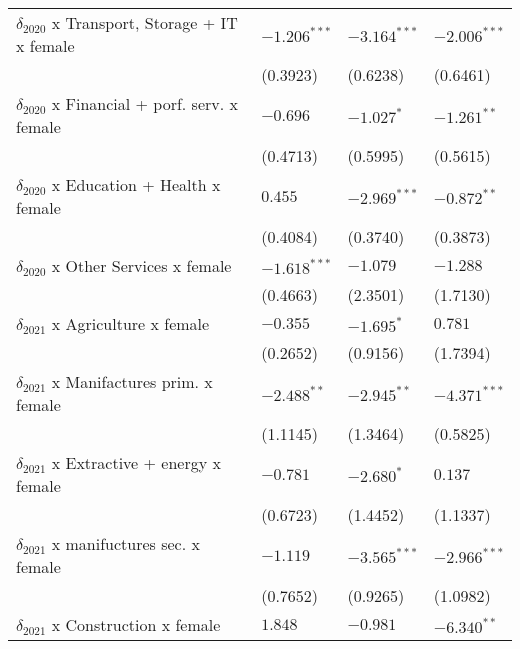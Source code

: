 \begin{tabular}{llll}
$\delta_{2020}$ x Transport, Storage + IT x female &     $-1.206^{***}$ &     $-3.164^{***}$ &     $-2.006^{***}$ \\
                                                   &           (0.3923) &           (0.6238) &           (0.6461) \\
$\delta_{2020}$ x Financial + porf. serv. x female &           $-0.696$ &         $-1.027^*$ &      $-1.261^{**}$ \\
                                                   &           (0.4713) &           (0.5995) &           (0.5615) \\
$\delta_{2020}$ x Education + Health x female      &            $0.455$ &     $-2.969^{***}$ &      $-0.872^{**}$ \\
                                                   &           (0.4084) &           (0.3740) &           (0.3873) \\
$\delta_{2020}$ x Other Services x female          &     $-1.618^{***}$ &           $-1.079$ &           $-1.288$ \\
                                                   &           (0.4663) &           (2.3501) &           (1.7130) \\
$\delta_{2021}$ x Agriculture x female             &           $-0.355$ &         $-1.695^*$ &            $0.781$ \\
                                                   &           (0.2652) &           (0.9156) &           (1.7394) \\
$\delta_{2021}$ x Manifactures prim. x female      &      $-2.488^{**}$ &      $-2.945^{**}$ &     $-4.371^{***}$ \\
                                                   &           (1.1145) &           (1.3464) &           (0.5825) \\
$\delta_{2021}$ x Extractive + energy x female     &           $-0.781$ &         $-2.680^*$ &            $0.137$ \\
                                                   &           (0.6723) &           (1.4452) &           (1.1337) \\
$\delta_{2021}$ x manifuctures sec. x female       &           $-1.119$ &     $-3.565^{***}$ &     $-2.966^{***}$ \\
                                                   &           (0.7652) &           (0.9265) &           (1.0982) \\
$\delta_{2021}$ x Construction x female            &            $1.848$ &           $-0.981$ &      $-6.340^{**}$ \\

\end{tabular}
